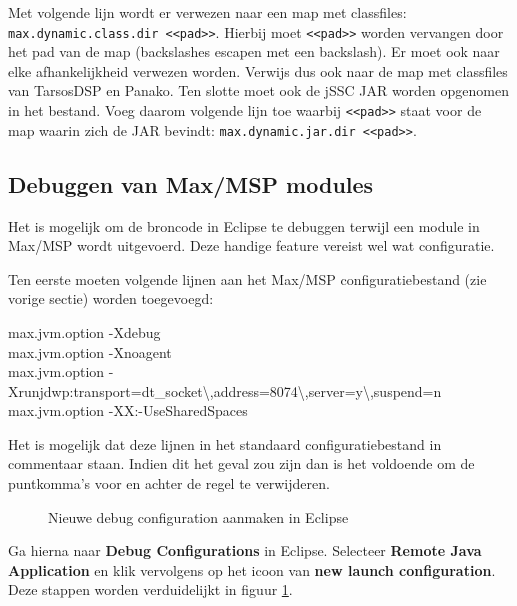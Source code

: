 Met volgende lijn wordt er verwezen naar een map met classfiles: \texttt{max.dynamic.class.dir <<pad>>}. Hierbij moet \texttt{<<pad>>} worden vervangen door het pad van de map (backslashes escapen met een backslash). Er moet ook naar elke afhankelijkheid verwezen worden. Verwijs dus ook naar de map met classfiles van TarsosDSP en Panako. Ten slotte moet ook de jSSC JAR worden opgenomen in het bestand. Voeg daarom volgende lijn toe waarbij \texttt{<<pad>>} staat voor de map waarin zich de JAR bevindt: \texttt{max.dynamic.jar.dir <<pad>>}.

\subsection*{Debuggen van Max/MSP modules}

Het is mogelijk om de broncode in Eclipse te debuggen terwijl een module in Max/MSP wordt uitgevoerd. Deze handige feature vereist wel wat configuratie.

Ten eerste moeten volgende lijnen aan het Max/MSP configuratiebestand (zie vorige sectie) worden toegevoegd:

\begin{allintypewriter}
max.jvm.option -Xdebug \\
max.jvm.option -Xnoagent \\
max.jvm.option -Xrunjdwp:transport=dt\_socket\textbackslash ,address=8074\textbackslash,server=y\textbackslash,suspend=n \\
max.jvm.option -XX:-UseSharedSpaces
\end{allintypewriter}
Het is mogelijk dat deze lijnen in het standaard configuratiebestand in commentaar staan. Indien dit het geval zou zijn dan is het voldoende om de puntkomma's voor en achter de regel te verwijderen.

\begin{figure}[!tbph]
	\centering
	\hfill
	\hfill
	\captionsetup{width=0.7\textwidth}
	\caption{Nieuwe debug configuration aanmaken in Eclipse}
	\label{debugconf}
\end{figure}

Ga hierna naar \textbf{Debug Configurations} in Eclipse. Selecteer \textbf{Remote Java Application} en klik vervolgens op het icoon van \textbf{new launch configuration}. Deze stappen worden verduidelijkt in figuur \ref{debugconf}.

